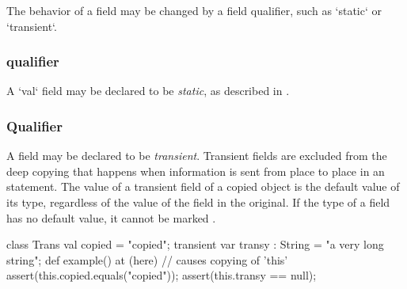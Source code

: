 The behavior of a field may be changed by a field qualifier, such as
\xcd`static` or \xcd`transient`.  


\subsubsection{ qualifier}

A \xcd`val` field may be declared to be {\em static}, as described in
. 

\subsubsection{ Qualifier}
\label{TransientFields}

A field may be declared to be {\em transient}.  Transient fields are excluded
from the deep copying that happens when information is sent from place to
place in an  statement.    The value of a transient field of a copied
object is the default value of its type, regardless of the value of the field
in the original.  If the type of a field has no
default value, it cannot be marked .


% 
\begin{xten}
class Trans { 
   val copied = "copied";
   transient var transy : String = "a very long string";
   def example() {
      at (here) { // causes copying of 'this'
         assert(this.copied.equals("copied"));
         assert(this.transy == null);
      }
   }
}
\end{xten}


